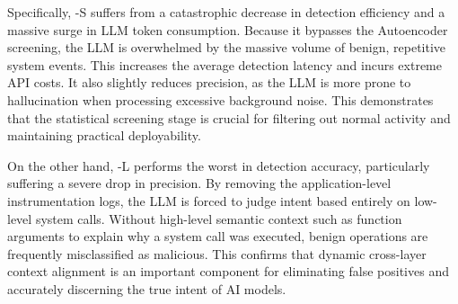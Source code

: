 Specifically, \toolname{}-S suffers from a catastrophic decrease in detection efficiency and a massive surge in LLM token consumption. Because it bypasses the Autoencoder screening, the LLM is overwhelmed by the massive volume of benign, repetitive system events. This increases the average detection latency and incurs extreme API costs. It also slightly reduces precision, as the LLM is more prone to hallucination when processing excessive background noise. This demonstrates that the statistical screening stage is crucial for filtering out normal activity and maintaining practical deployability.

On the other hand, \toolname{}-L performs the worst in detection accuracy, particularly suffering a severe drop in precision. By removing the application-level instrumentation logs, the LLM is forced to judge intent based entirely on low-level system calls. Without high-level semantic context such as function arguments to explain why a system call was executed, benign operations are frequently misclassified as malicious. This confirms that dynamic cross-layer context alignment is an important component for eliminating false positives and accurately discerning the true intent of AI models.



